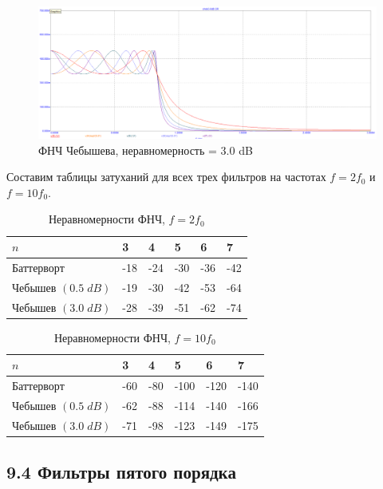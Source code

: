 \documentclass[12pt,a4paper]{article}
\begin{document}
	\begin{figure}[H]
		\centering
		\includegraphics[width=1.0\linewidth]{res/cheb3.png}
		\caption{ФНЧ Чебышева, неравномерность = $3.0$ dB}
		\label{phase}
	\end{figure}

	Составим таблицы затуханий для всех трех фильтров на частотах $f = 2f_0$ и $f = 10 f_0$.

	\begin{table}[H]
		\begin{tabular}{llllll}
			\hline
			$n$                   & 3   & 4   & 5   & 6   & 7   \\ \hline
			Баттерворт            & -18 & -24 & -30 & -36 & -42 \\
			Чебышев $(0.5 \; dB)$ & -19 & -30 & -42 & -53 & -64 \\
			Чебышев $(3.0 \; dB)$ & -28 & -39 & -51 & -62 & -74 \\ \hline
		\end{tabular}
		\caption{Неравномерности ФНЧ, $f=2 f_0$}
	\end{table}

	\begin{table}[H]
		\begin{tabular}{llllll}
			\hline
			$n$                   & 3   & 4   & 5    & 6    & 7    \\ \hline
			Баттерворт            & -60 & -80 & -100 & -120 & -140 \\
			Чебышев $(0.5 \; dB)$ & -62 & -88 & -114 & -140 & -166 \\
			Чебышев $(3.0 \; dB)$ & -71 & -98 & -123 & -149 & -175 \\ \hline
		\end{tabular}
		\caption{Неравномерности ФНЧ, $f=10 f_0$}
	\end{table}


	\subsection*{9.4 Фильтры пятого порядка}
	
\end{document}
